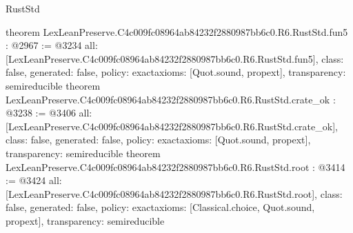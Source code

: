 \begin{lexlean}{RustStd}
\begin{coremodule}
{}
theorem LexLeanPreserve.C4c009fc08964ab84232f2880987bb6c0.R6.RustStd.fun5 : @2967 := @3234 {
  all: [LexLeanPreserve.C4c009fc08964ab84232f2880987bb6c0.R6.RustStd.fun5],
  class: false,
  generated: false,
  policy: exact{axioms: [Quot.sound, propext]},
  transparency: semireducible
}
theorem LexLeanPreserve.C4c009fc08964ab84232f2880987bb6c0.R6.RustStd.crate_ok : @3238 := @3406 {
  all: [LexLeanPreserve.C4c009fc08964ab84232f2880987bb6c0.R6.RustStd.crate_ok],
  class: false,
  generated: false,
  policy: exact{axioms: [Quot.sound, propext]},
  transparency: semireducible
}
theorem LexLeanPreserve.C4c009fc08964ab84232f2880987bb6c0.R6.RustStd.root : @3414 := @3424 {
  all: [LexLeanPreserve.C4c009fc08964ab84232f2880987bb6c0.R6.RustStd.root],
  class: false,
  generated: false,
  policy: exact{axioms: [Classical.choice, Quot.sound, propext]},
  transparency: semireducible
}


\end{coremodule}
\end{lexlean}
